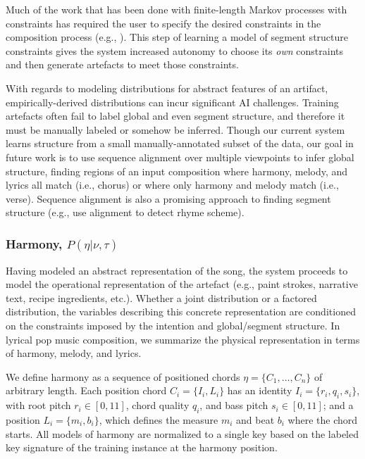 \documentclass[letterpaper]{article}
\begin{document}
Much of the work that has been done with finite-length Markov processes with constraints \cite{pachet2001finite} has required the user to specify the desired constraints in the composition process (e.g., \cite{barbieri2012markov}). This step of learning a model of segment structure constraints gives the system increased autonomy to choose its \emph{own} constraints and then generate artefacts to meet those constraints.

With regards to modeling distributions for abstract features of an artifact, empirically-derived distributions can incur significant AI challenges. Training artefacts often fail to label global and even segment structure, and therefore it must be manually labeled or somehow be inferred. Though our current system learns structure from a small manually-annotated subset of the data, our goal in future work is to use sequence alignment over multiple viewpoints to infer global structure, finding regions of an input composition where harmony, melody, and lyrics all match (i.e., chorus) or where only harmony and melody match (i.e., verse). Sequence alignment is also a promising approach to finding segment structure (e.g., \cite{hirjee2010using} use alignment to detect rhyme scheme).

\subsubsection{Harmony, $P(\eta|\nu,\tau)$}

Having modeled an abstract representation of the song, the system proceeds to model the operational representation of the artefact (e.g., paint strokes, narrative text, recipe ingredients, etc.). Whether a joint distribution or a factored distribution, the variables describing this concrete representation are conditioned on the constraints imposed by the intention and global/segment structure. In lyrical pop music composition, we summarize the physical representation in terms of harmony, melody, and lyrics.

We define harmony as a sequence of positioned chords $\eta = \{C_1,\dots,C_n\}$ of arbitrary length. Each position chord $C_i = \{I_i,L_i\}$ has an identity $I_i = \{r_i,q_i,s_i\}$, with root pitch $r_i\in[0,11]$, chord quality $q_i$, and bass pitch $s_i\in[0,11]$; and a position $L_i = \{m_i,b_i\}$, which defines the measure $m_i$ and beat $b_i$ where the chord starts. All models of harmony are normalized to a single key based on the labeled key signature of the training instance at the harmony position.
\end{document}

